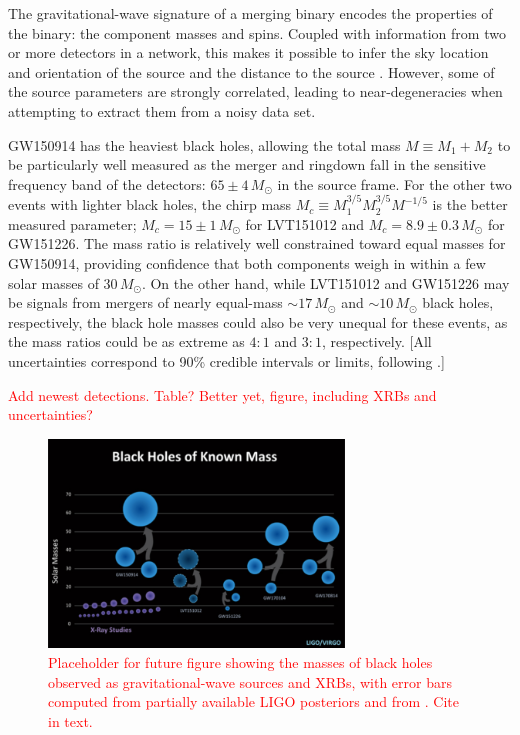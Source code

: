 \documentclass[iop,onecolumn]{revtex4}
\newcommand{\todo}[1]{\textcolor{red}{#1}}
\begin{document}
The gravitational-wave signature of a merging binary encodes the properties of the binary: the component masses and spins. Coupled with information from two or more detectors in a network, this makes it possible to infer the sky location and orientation of the source and the distance to the source \citep{Veitch:2015,GW150914:PE}.  However, some of the source parameters are strongly correlated, leading to near-degeneracies when attempting to extract them from a noisy data set.  

GW150914 has the heaviest black holes, allowing the total mass $M \equiv M_1 + M_2$ to be particularly well measured as the merger and ringdown fall in the sensitive frequency band of the detectors: $65 \pm 4\, M_\odot$ in the source frame.  For the other two events with lighter black holes, the chirp mass $M_c \equiv M_1^{3/5} M_2^{3/5} M^{-1/5}$ is the better measured parameter; $M_c = 15 \pm 1\, M_\odot$ for LVT151012 and  $M_c = 8.9 \pm 0.3\, M_\odot$ for GW151226.  The mass ratio is relatively well constrained toward equal masses for GW150914, providing confidence that both components weigh in within a few solar masses of $30\, M_\odot$.  On the other hand, while LVT151012 and GW151226 may be signals from mergers of nearly equal-mass $\sim 17\, M_\odot$ and $\sim 10\, M_\odot$ black holes, respectively, the black hole masses could also be very unequal for these events, as the mass ratios could be as extreme as $4:1$ and $3:1$, respectively. 
[All uncertainties correspond to 90\% credible intervals or limits, following \citet{BBH:O1}.]

\todo {Add newest detections.  Table?  Better yet, figure, including XRBs and uncertainties?}

\begin{figure}
	\centering
	\includegraphics[width=0.7\textwidth]{BHmass.png}
	\caption{\label{fig:BHmasses} \todo{Placeholder for future figure showing the masses of black holes observed as gravitational-wave sources and XRBs, with error bars computed from partially available LIGO posteriors and from \citep{Farr:2011}.  Cite in text.}}
\end{figure}
\end{document}
